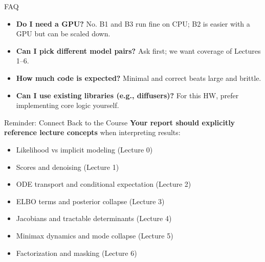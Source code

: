 \documentclass[aspectratio=169]{beamer}
\begin{document}
\begin{frame}{FAQ}
\small
\begin{itemize}
  \item \textbf{Do I need a GPU?} No. B1 and B3 run fine on CPU; B2 is easier with a GPU but can be scaled down.
  \item \textbf{Can I pick different model pairs?} Ask first; we want coverage of Lectures 1--6.
  \item \textbf{How much code is expected?} Minimal and correct beats large and brittle.
  \item \textbf{Can I use existing libraries (e.g., diffusers)?} For this HW, prefer implementing core logic yourself.
\end{itemize}
\end{frame}

\begin{frame}{Reminder: Connect Back to the Course}
\small
\textbf{Your report should explicitly reference lecture concepts} when interpreting results:
\begin{itemize}
  \item Likelihood vs implicit modeling (Lecture 0)
  \item Scores and denoising (Lecture 1)
  \item ODE transport and conditional expectation (Lecture 2)
  \item ELBO terms and posterior collapse (Lecture 3)
  \item Jacobians and tractable determinants (Lecture 4)
  \item Minimax dynamics and mode collapse (Lecture 5)
  \item Factorization and masking (Lecture 6)
\end{itemize}
\end{frame}
\end{document}
